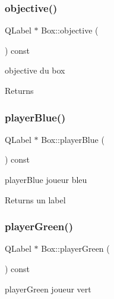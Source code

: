 \subsubsection{\texorpdfstring{objective()}{objective()}}
{\footnotesize\ttfamily Q\+Label $\ast$ Box\+::objective (\begin{DoxyParamCaption}{ }\end{DoxyParamCaption}) const\hspace{0.3cm}{\ttfamily [inline]}}



objective du box 

\begin{DoxyReturn}{Returns}

\end{DoxyReturn}
\mbox{\label{class_box_abd111ee14102d32764733f0459d691a7}} 
\subsubsection{\texorpdfstring{player\+Blue()}{playerBlue()}}
{\footnotesize\ttfamily Q\+Label $\ast$ Box\+::player\+Blue (\begin{DoxyParamCaption}{ }\end{DoxyParamCaption}) const\hspace{0.3cm}{\ttfamily [inline]}}



player\+Blue joueur bleu 

\begin{DoxyReturn}{Returns}
un label 
\end{DoxyReturn}
\mbox{\label{class_box_a641488c3839a9825f06aaf4b82ccba32}} 
\subsubsection{\texorpdfstring{player\+Green()}{playerGreen()}}
{\footnotesize\ttfamily Q\+Label $\ast$ Box\+::player\+Green (\begin{DoxyParamCaption}{ }\end{DoxyParamCaption}) const\hspace{0.3cm}{\ttfamily [inline]}}



player\+Green joueur vert 

